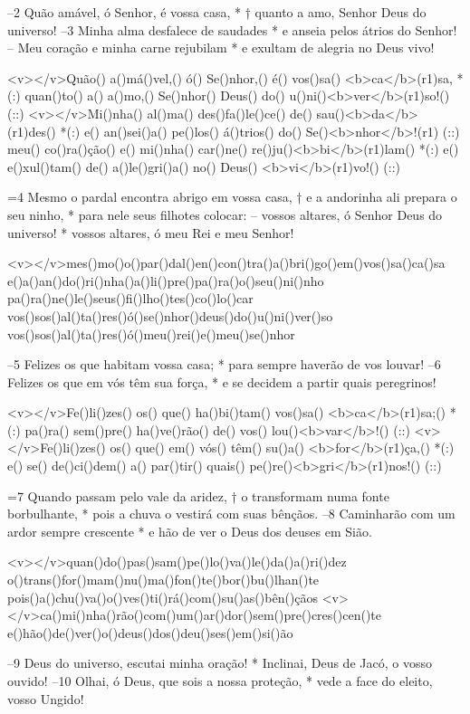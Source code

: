 –2 Quão amável, ó Senhor, é vossa casa, * 
† quanto a amo, Senhor Deus do universo!
–3 Minha alma desfalece de saudades * 
e anseia pelos átrios do Senhor! 
– Meu coração e minha carne rejubilam * 
e exultam de alegria no Deus vivo!

<v></v>Quão() a()má()vel,() ó() Se()nhor,() é() vos()sa() <b>ca</b>(r1)sa, *(:)
quan()to() a() a()mo,() Se()nhor() Deus() do() u()ni()<b>ver</b>(r1)so!() (::)
<v></v>Mi()nha() al()ma() des()fa()le()ce() de() sau()<b>da</b>(r1)des() *(:)
e() an()sei()a() pe()los() á()trios() do() Se()<b>nhor</b>!(r1) (::)
meu() co()ra()ção() e() mi()nha() car()ne() re()ju()<b>bi</b>(r1)lam() *(:)
e() e()xul()tam() de() a()le()gri()a() no() Deus() <b>vi</b>(r1)vo!() (::)

=4 Mesmo o pardal encontra abrigo em vossa casa, † 
e a andorinha ali prepara o seu ninho, * 
para nele seus filhotes colocar:
– vossos altares, ó Senhor Deus do universo! * 
vossos altares, ó meu Rei e meu Senhor!

<v></v>mes()mo()o()par()dal()en()con()tra()a()bri()go()em()vos()sa()ca()sa
e()a()an()do()ri()nha()a()li()pre()pa()ra()o()seu()ni()nho
pa()ra()ne()le()seus()fi()lho()tes()co()lo()car
vos()sos()al()ta()res()ó()se()nhor()deus()do()u()ni()ver()so
vos()sos()al()ta()res()ó()meu()rei()e()meu()se()nhor

–5 Felizes os que habitam vossa casa; * 
para sempre haverão de vos louvar!
–6 Felizes os que em vós têm sua força, * 
e se decidem a partir quais peregrinos!

<v></v>Fe()li()zes() os() que() ha()bi()tam() vos()sa() <b>ca</b>(r1)sa;() *(:)
pa()ra() sem()pre() ha()ve()rão() de() vos() lou()<b>var</b>!() (::)
<v></v>Fe()li()zes() os() que() em() vós() têm() su()a() <b>for</b>(r1)ça,() *(:)
e() se() de()ci()dem() a() par()tir() quais() pe()re()<b>gri</b>(r1)nos!() (::)

=7 Quando passam pelo vale da aridez, † 
o transformam numa fonte borbulhante, * 
pois a chuva o vestirá com suas bênçãos.
–8 Caminharão com um ardor sempre crescente * 
e hão de ver o Deus dos deuses em Sião.

<v></v>quan()do()pas()sam()pe()lo()va()le()da()a()ri()dez
o()trans()for()mam()nu()ma()fon()te()bor()bu()lhan()te
pois()a()chu()va()o()ves()ti()rá()com()su()as()bên()çãos
<v></v>ca()mi()nha()rão()com()um()ar()dor()sem()pre()cres()cen()te
e()hão()de()ver()o()deus()dos()deu()ses()em()si()ão

–9 Deus do universo, escutai minha oração! * 
Inclinai, Deus de Jacó, o vosso ouvido!
–10 Olhai, ó Deus, que sois a nossa proteção, * 
vede a face do eleito, vosso Ungido!


